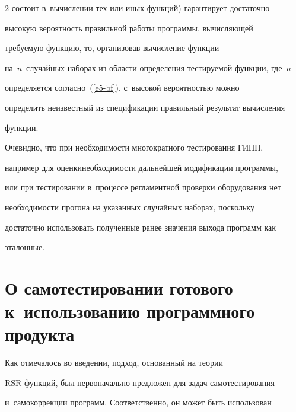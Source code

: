 \begin{multicols}{2}
состоит в~вычислении тех или иных функций) гарантирует достаточно 


высокую вероятность правильной работы программы, вычисляющей 


требуемую функцию, то, организовав вычисление функции 


на~$n$~случайных наборах из области определения тестируемой функции, где~$n$ 


определяется согласно~(\ref{e5-bf}), с~высокой вероятностью можно 


определить неизвестный из спецификации правильный результат вычисления 


функции.


    


    Очевидно, что при необходимости многократ\-ного тестирования ГИПП, 


например для оценки\linebreak не\-об\-хо\-ди\-мости дальнейшей модификации программы, 


или при тестировании в~процессе регла\-мент\-ной проверки оборудования нет 


не\-об\-хо\-ди\-мости прогона на указанных случайных наборах, поскольку 


достаточно использовать полученные ранее значения выхода программ как 


эталонные.





\vspace*{-9pt}


    


\section{О самотестировании готового к~использованию программного продукта}





\vspace*{-3pt}





    Как отмечалось во введении, подход, основанный на теории  


RSR-функ\-ций, был первоначально предложен для задач самотестирования 


и~самокоррекции программ. Соответственно, он может быть использован 



\end{multicols}
